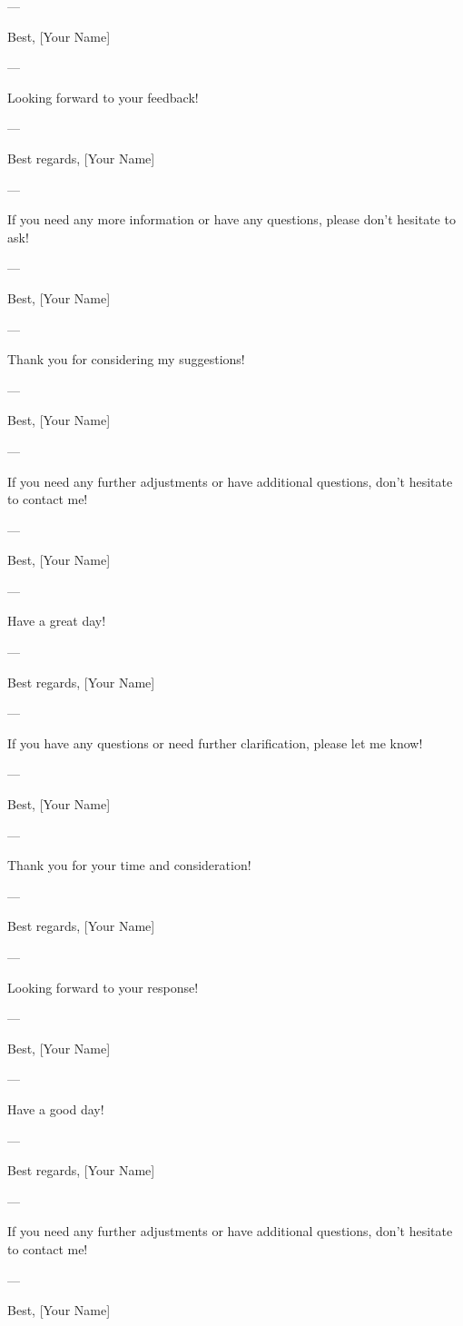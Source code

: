 --- 

Best,  
[Your Name]  

--- 

Looking forward to your feedback! 

--- 

Best regards,  
[Your Name]  

--- 

If you need any more information or have any questions, please don't hesitate to ask! 

--- 

Best,  
[Your Name]  

--- 

Thank you for considering my suggestions! 

--- 

Best,  
[Your Name]  

--- 

If you need any further adjustments or have additional questions, don't hesitate to contact me! 

--- 

Best,  
[Your Name]  

--- 

Have a great day! 

--- 

Best regards,  
[Your Name]  

--- 

If you have any questions or need further clarification, please let me know! 

--- 

Best,  
[Your Name]  

--- 

Thank you for your time and consideration! 

--- 

Best regards,  
[Your Name]  

--- 

Looking forward to your response! 

--- 

Best,  
[Your Name]  

--- 

Have a good day! 

--- 

Best regards,  
[Your Name]  

--- 

If you need any further adjustments or have additional questions, don't hesitate to contact me! 

--- 

Best,  
[Your Name]  

